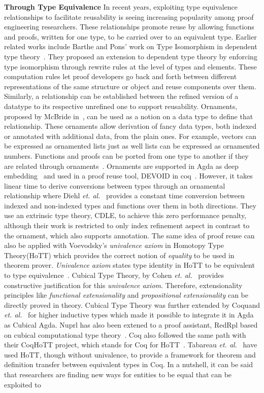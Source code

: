 \textbf{Through Type Equivalence} In recent years, exploiting type equivalence relationships to facilitate reusability is seeing increasing popularity among proof engineering researchers. These relationships promote reuse by allowing functions and proofs, written for one type, to be carried over to an equivalent type. Earlier related works include Barthe and Pons' work on Type Isomorphism in dependent type theory~\cite{Barthe_Pons_2001}. They proposed an extension to dependent type theory by enforcing type isomorphism through rewrite rules at the level of types and elements. These computation rules let proof developers go back and forth between different representations of the same structure or object and reuse components over them. Similarly, a relationship can be established between the refined version of a datatype to its respective unrefined one to support reusability. Ornaments, proposed by McBride in~\cite{McBride_2011}, can be used as a notion on a data type to define that relationship. These ornaments allow derivation of fancy data types, both indexed or annotated with additional data, from the plain ones. For example, vectors can be expressed as ornamented lists just as well lists can be expressed as ornamented numbers. Functions and proofs can be ported from one type to another if they are related through ornaments~\cite{Dagand_McBride_2012}. Ornaments are supported in Agda as deep embedding~\cite{Williams_2014} and used in a proof reuse tool, DEVOID in coq~\cite{ringer_et_al_2019_b}. However, it takes linear time to derive conversions between types through an ornamental relationship where Diehl \emph{et. al.}~\cite{Diehl_et_al_2018} provides a constant time conversion between indexed and non-indexed types and functions over them in both directions. They use an extrinsic type theory, CDLE, to achieve this zero performance penalty, although their work is restricted to only index refinement aspect in contrast to the ornament, which also supports annotation. The same idea of proof reuse can also be applied with Voevodsky's \emph{univalence axiom} in Homotopy Type Theory(HoTT) which provides the correct notion of \emph{equality} to be used in theorem prover. \emph{Univalence axiom} states type identity in HoTT to be equivalent to type equivalence~\cite{Awodey_et_al_2013}. Cubical Type Theory, by Cohen \emph{et. al.}~\cite{cohen_et_al_2018} provides constructive justification for this \emph{univalence axiom}. Therefore, extensionality principles like \emph{functional extensionality} and \emph{propositional extensionality} can be directly proved in theory. Cubical Type Theory was further extended by Coquand \emph{et. al.}~\cite{Coquand_et_al_2018} for higher inductive types which made it possible to integrate it in Agda as Cubical Agda. Nuprl has also been extened to a proof assistant, RedRpl based on cubical computational type theory~\cite{Angiuli_et_al_2018}. Coq also followed the same path with their CoqHoTT project, which stands for Coq for HoTT~\cite{CoqHoTT_2015}. Tabareau \emph{et. al.}~\cite{Tabareau_et_al_2018} have used HoTT, though without univalence, to provide a framework for theorem and definition transfer between equivalent types in Coq. In a nutshell, it can be said that researchers are finding new ways for entities to be equal that can be exploited to 
